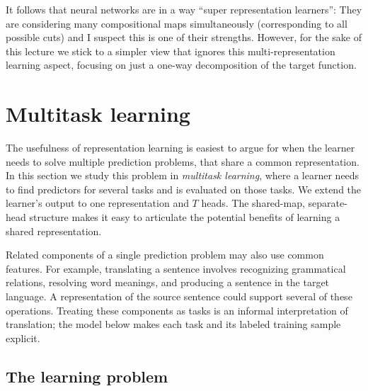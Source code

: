 \documentclass[11pt,twoside]{article}
\theoremstyle{definition}
\theoremstyle{remark}
\begin{document}
It follows that neural networks are in a way ``super representation learners'':
They are considering many compositional maps simultaneously (corresponding to all possible
cuts) and I suspect this is one of their strengths. However, for the sake
of this lecture we stick to a simpler view that ignores this multi-representation
learning aspect, focusing on just a one-way decomposition of the target
function.


\section{Multitask learning}
\label{sec:multitask-learning}
The usefulness of representation learning is easiest to argue for
when the learner needs to solve multiple prediction problems,
that share a common representation. In this section
we study this problem
in \emph{multitask learning},
where a learner needs to find predictors for several tasks and
is evaluated on those tasks.
We extend the learner's output to one
representation and $T$ heads. The shared-map, separate-head structure makes
it easy to articulate  the potential benefits of learning a shared representation.

Related components of a single prediction problem may also use common
features. For example, translating a sentence involves recognizing grammatical
relations, resolving word meanings, and producing a sentence in the target
language. A representation of the source sentence could support several of
these operations. Treating these components as tasks is an informal
interpretation of translation; the model below makes each task and its
labeled training sample explicit.

\subsection{The learning problem}
\label{sec:setup}
\end{document}
